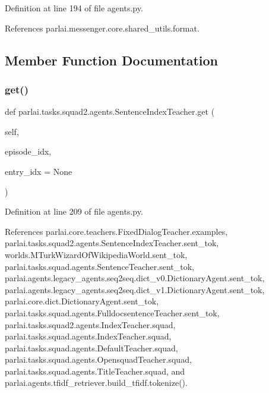 Definition at line 194 of file agents.\+py.



References parlai.\+messenger.\+core.\+shared\+\_\+utils.\+format.



\subsection{Member Function Documentation}
\mbox{\label{classparlai_1_1tasks_1_1squad2_1_1agents_1_1SentenceIndexTeacher_a61367987adc2bf1f623e66d6f690ad57}} 
\subsubsection{\texorpdfstring{get()}{get()}}
{\footnotesize\ttfamily def parlai.\+tasks.\+squad2.\+agents.\+Sentence\+Index\+Teacher.\+get (\begin{DoxyParamCaption}\item[{}]{self,  }\item[{}]{episode\+\_\+idx,  }\item[{}]{entry\+\_\+idx = {\ttfamily None} }\end{DoxyParamCaption})}



Definition at line 209 of file agents.\+py.



References parlai.\+core.\+teachers.\+Fixed\+Dialog\+Teacher.\+examples, parlai.\+tasks.\+squad2.\+agents.\+Sentence\+Index\+Teacher.\+sent\+\_\+tok, worlds.\+M\+Turk\+Wizard\+Of\+Wikipedia\+World.\+sent\+\_\+tok, parlai.\+tasks.\+squad.\+agents.\+Sentence\+Teacher.\+sent\+\_\+tok, parlai.\+agents.\+legacy\+\_\+agents.\+seq2seq.\+dict\+\_\+v0.\+Dictionary\+Agent.\+sent\+\_\+tok, parlai.\+agents.\+legacy\+\_\+agents.\+seq2seq.\+dict\+\_\+v1.\+Dictionary\+Agent.\+sent\+\_\+tok, parlai.\+core.\+dict.\+Dictionary\+Agent.\+sent\+\_\+tok, parlai.\+tasks.\+squad.\+agents.\+Fulldocsentence\+Teacher.\+sent\+\_\+tok, parlai.\+tasks.\+squad2.\+agents.\+Index\+Teacher.\+squad, parlai.\+tasks.\+squad.\+agents.\+Index\+Teacher.\+squad, parlai.\+tasks.\+squad.\+agents.\+Default\+Teacher.\+squad, parlai.\+tasks.\+squad.\+agents.\+Opensquad\+Teacher.\+squad, parlai.\+tasks.\+squad.\+agents.\+Title\+Teacher.\+squad, and parlai.\+agents.\+tfidf\+\_\+retriever.\+build\+\_\+tfidf.\+tokenize().



